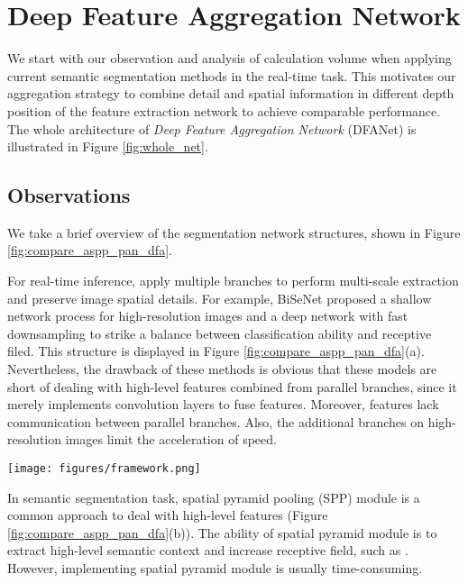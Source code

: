 \documentclass[10pt,twocolumn,letterpaper]{article}
\begin{document}
\section{Deep Feature Aggregation Network}
We start with our observation and analysis of calculation volume when applying current semantic segmentation methods in the real-time task. This motivates our aggregation strategy to combine detail and spatial information in different depth position of the feature extraction network to achieve comparable performance. The whole architecture of \textit{Deep Feature Aggregation Network} (DFANet) is illustrated in Figure \ref{fig:whole_net}.

\subsection{Observations}
We take a brief overview of the segmentation network structures, shown in Figure \ref{fig:compare_aspp_pan_dfa}.

For real-time inference, \cite{ICNet}\cite{BiSeNet} apply multiple branches to perform multi-scale extraction and preserve image spatial details. For example, BiSeNet\cite{BiSeNet} proposed a shallow network process for high-resolution images and a deep network with fast downsampling to strike a balance between classification ability and receptive filed. This structure is displayed in Figure \ref{fig:compare_aspp_pan_dfa}(a).
Nevertheless, the drawback of these methods is obvious that these models are short of dealing with high-level features combined from parallel branches, since it merely implements convolution layers to fuse features. Moreover, features lack communication between parallel branches. Also, the additional branches on high-resolution images limit the acceleration of speed.

\begin{figure*}
\begin{center}
\texttt{[image: figures/framework.png]}
\end{center}
   \caption{Overview of our Deep Feature Aggregation Network: sub-network aggregation, sub-stage aggregation, and dual-path decoder for multi-level feature fusion. In the figure, "C" means concatenation, "xN" is N$\times$ up-sampling operation.}
\label{fig:whole_net}
\end{figure*}

In semantic segmentation task, spatial pyramid pooling (SPP) module is a common approach to deal with high-level features
\cite{deeplanv3} (Figure \ref{fig:compare_aspp_pan_dfa}(b)). The ability of spatial pyramid module is to extract high-level semantic context and increase receptive field, such as \cite{DeepLab2}\cite{pspnet}\cite{pan}. However, 
implementing spatial pyramid module is usually time-consuming. 
\end{document}
